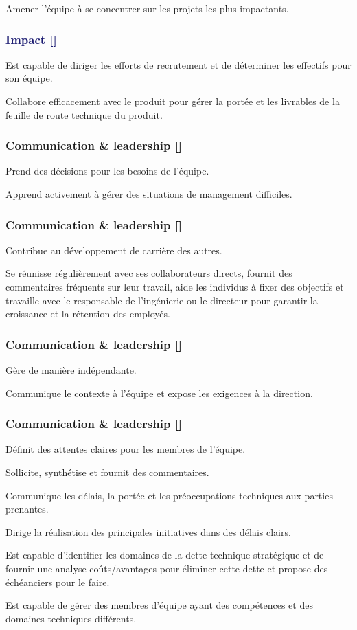 \documentclass[a4paper, french, openany, 12pt]{book}
\newcommand\wis{\textcolor{MidnightBlue}{\textbf{Impact [\bsc{WIS}]}}}
\newcommand\cha{\textcolor{RawSienna}{\textbf{Communication \& leadership [\bsc{CHA}]}}}
\begin{document}
\begin{multicols}{2}
  Amener l'équipe à se concentrer sur les projets les plus impactants.

  \subsubsection*{\wis}

  Est capable de diriger les efforts de recrutement et de déterminer les effectifs pour son équipe.

  Collabore efficacement avec le produit pour gérer la portée et les livrables de la feuille de route technique du 
  produit.

  \subsubsection*{\cha}

  Prend des décisions pour les besoins de l'équipe.

  Apprend activement à gérer des situations de management difficiles.

  \subsubsection*{\cha}
  Contribue au développement de carrière des autres.

  Se réunisse régulièrement avec ses collaborateurs directs, fournit des commentaires fréquents sur leur travail, aide les
  individus à fixer des objectifs et travaille avec le responsable de l'ingénierie ou le directeur pour garantir la 
  croissance et la rétention des employés.

  \subsubsection*{\cha}

  Gère de manière indépendante.

  Communique le contexte à l'équipe et expose les exigences à la direction.

  \subsubsection*{\cha}

  Définit des attentes claires pour les membres de l'équipe.

  Sollicite, synthétise et fournit des commentaires.

  Communique les délais, la portée et les préoccupations techniques aux parties prenantes.

  Dirige la réalisation des principales initiatives dans des délais clairs.

  Est capable d'identifier les domaines de la dette technique stratégique et de fournir une analyse coûts/avantages pour 
  éliminer cette dette et propose des échéanciers pour le faire.

  Est capable de gérer des membres d'équipe ayant des compétences et des domaines techniques différents.

\end{multicols}
\end{document}
